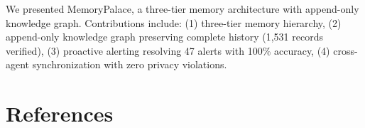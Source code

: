 \documentclass[11pt,a4paper]{article}
\begin{document}
We presented MemoryPalace, a three-tier memory architecture with append-only knowledge graph. Contributions include: (1) three-tier memory hierarchy, (2) append-only knowledge graph preserving complete history (1,531 records verified), (3) proactive alerting resolving 47 alerts with 100\% accuracy, (4) cross-agent synchronization with zero privacy violations.

\section*{References}



\end{document}
